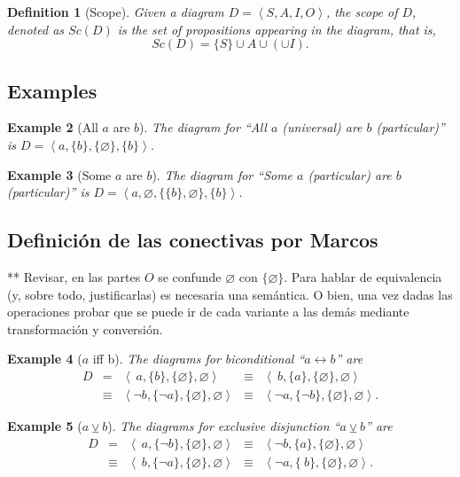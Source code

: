 \documentclass{article}
\newtheorem{definition}{Definition}
\newtheorem{example}[definition]{Example}
\newcommand{\cred}[1]{{\color{red}#1}}
\begin{document}
\begin{definition}[Scope]
Given a diagram $D=\left<S,A,I,O\right>$, the \emph{scope} of $D$, denoted as $Sc(D)$ is the set of propositions appearing in the diagram, that is,
\[Sc(D) = \{S\} \cup A \cup (\cup I).\]
\end{definition}

\subsection{Examples}

\begin{example}[All $a$ are $b$]
\label{ex1}
The diagram for ``All 
$a$ (universal) are $b$ (particular)'' is 
$D=\left<a,\{b\}, \{\varnothing\}, \{b\}\right>$.
\end{example}

\begin{example}[Some $a$ are $b$] 
\label{ex2}
The diagram for ``Some 
$a$ (particular) are $b$ (particular)'' is 
$D=\left<a,\varnothing, \{\{b\},\varnothing\}, \{b\}\right>$.
\end{example}


\subsection{Definición de las conectivas por Marcos}

\cred{** Revisar, en las partes $O$ se confunde $\varnothing$ con $\{\varnothing\}$. Para hablar de equivalencia (y, sobre todo, justificarlas) es necesaria una semántica. O bien, una vez dadas las operaciones probar que se puede ir de cada variante a las demás mediante transformación y conversión.}

\begin{example}[$a$ iff b]
The diagrams for biconditional ``$a \leftrightarrow b$''  are
\[
\begin{array}{rclcl}
D &=& \left<\ a,\{ b\}, \{\varnothing\}, \varnothing\right> 
& \equiv & \left<\ b,\{a\}, \{ \varnothing\}, \varnothing\right> \\
& \equiv & \left< \lnot b,\{\lnot a \}, \{\varnothing\}, \varnothing\right> & \equiv & \left< \lnot a,\{\lnot b\}, \{ \varnothing\}, \varnothing\right>.
\end{array}\]
\end{example}

\begin{example}[$a \veebar b$] 
The diagrams for exclusive disjunction ``$a \veebar  b$'' are
\[
\begin{array}{rclcl}
D&=& \left<\ a,\{ \lnot b\}, \{\varnothing\}, \varnothing\right> & \equiv & \left<\lnot b,\{a\}, \{ \varnothing\}, \varnothing\right>\\
& \equiv & \left< \ b,\{\lnot a \}, \{\varnothing\}, \varnothing\right> & \equiv & \left< \lnot a,\{\ b\}, \{ \varnothing\}, \varnothing\right>.
\end{array}\]
\end{example}
\end{document}

